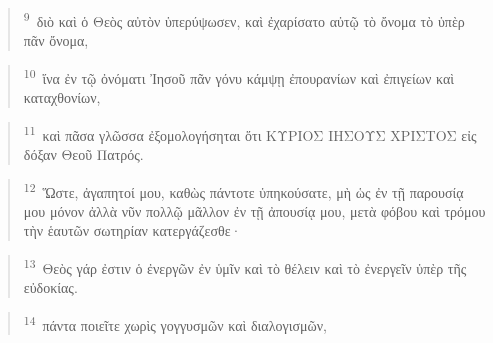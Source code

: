 \documentclass{article}
\newcommand{\currentverse}{1} %
\newcommand{\setcurrentverse}[1]{\renewcommand{\currentverse}{#1}}
\begin{document}
\begin{verse}

\setcurrentverse{9}

\setcounter{footnote}{0}

\textsuperscript{9}~διὸ καὶ ὁ Θεὸς αὐτὸν ὑπερύψωσεν, καὶ ἐχαρίσατο αὐτῷ τὸ ὄνομα τὸ ὑπὲρ πᾶν ὄνομα,

\end{verse}

\begin{verse}

\setcurrentverse{10}

\setcounter{footnote}{0}

\textsuperscript{10}~ἵνα ἐν τῷ ὀνόματι Ἰησοῦ πᾶν γόνυ κάμψῃ ἐπουρανίων καὶ ἐπιγείων καὶ καταχθονίων,

\end{verse}

\begin{verse}

\setcurrentverse{11}

\setcounter{footnote}{0}

\textsuperscript{11}~καὶ πᾶσα γλῶσσα ἐξομολογήσηται ὅτι ΚΥΡΙΟΣ ΙΗΣΟΥΣ ΧΡΙΣΤΟΣ εἰς δόξαν Θεοῦ Πατρός.

\end{verse}

\begin{verse}

\setcurrentverse{12}

\setcounter{footnote}{0}

\textsuperscript{12}~Ὥστε, ἀγαπητοί μου, καθὼς πάντοτε ὑπηκούσατε, μὴ ὡς ἐν τῇ παρουσίᾳ μου μόνον ἀλλὰ νῦν πολλῷ μᾶλλον ἐν τῇ ἀπουσίᾳ μου, μετὰ φόβου καὶ τρόμου τὴν ἑαυτῶν σωτηρίαν κατεργάζεσθε·

\end{verse}

\begin{verse}

\setcurrentverse{13}

\setcounter{footnote}{0}

\textsuperscript{13}~Θεὸς γάρ ἐστιν ὁ ἐνεργῶν ἐν ὑμῖν καὶ τὸ θέλειν καὶ τὸ ἐνεργεῖν ὑπὲρ τῆς εὐδοκίας.

\end{verse}

\begin{verse}

\setcurrentverse{14}

\setcounter{footnote}{0}

\textsuperscript{14}~πάντα ποιεῖτε χωρὶς γογγυσμῶν καὶ διαλογισμῶν,

\end{verse}
\end{document}
